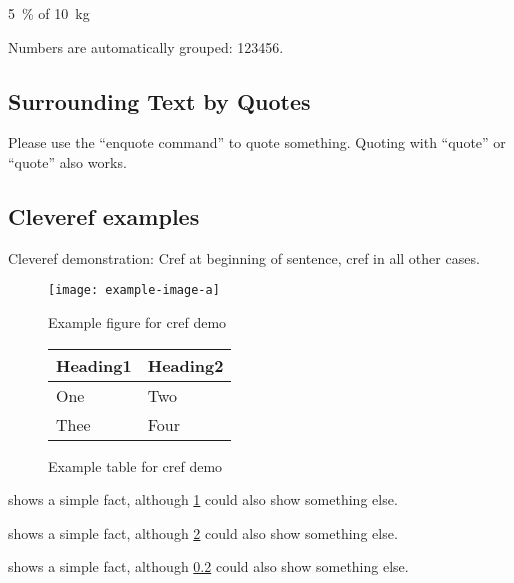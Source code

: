 \documentclass[conference,a4paper]{IEEEtran}[2015/08/26]
\begin{document}
\begin{ltgexample}
\SI{5}{\percent} of \SI{10}{kg}
\end{ltgexample}

\begin{ltgexample}
Numbers are automatically grouped: \num{123456}.
\end{ltgexample}

\subsection{Surrounding Text by Quotes}

\begin{ltgexample}
Please use the \enquote{enquote command} to quote something.
Quoting with "`quote"' or ``quote'' also works.

\end{ltgexample}
\subsection{Cleveref examples}
\label{sec:ex:cref}

Cleveref demonstration: Cref at beginning of sentence, cref in all other cases.

\begin{figure}
    \centering
    \texttt{[image: example-image-a]}
    \caption{Example figure for cref demo}
    \label{fig:ex:cref}
\end{figure}

\begin{figure}
    \centering
    \begin{tabular}{ll}
      \toprule
      Heading1 & Heading2 \\
      \midrule
      One      & Two      \\
      Thee     & Four     \\
      \bottomrule
    \end{tabular}
    \caption{Example table for cref demo}
    \label{tab:ex:cref}
\end{figure}

\begin{ltgexample}
 shows a simple fact, although \cref{fig:ex:cref} could also show something else.

 shows a simple fact, although \cref{tab:ex:cref} could also show something else.

 shows a simple fact, although \cref{sec:ex:cref} could also show something else.
\end{ltgexample}
\end{document}
